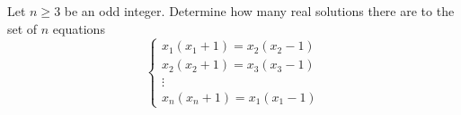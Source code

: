 Let $n\geq 3$ be an odd integer. Determine how many real solutions there are to the set of $n$ equations
\[\left\{\begin{array}{cc}x_1(x_1+1)=x_2(x_2-1)\\x_2(x_2+1)=x_3(x_3-1)\\ \vdots \\ x_n(x_n+1) = x_1(x_1-1)\end{array}\right.\]